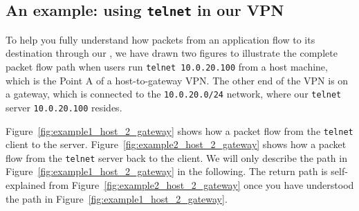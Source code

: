 \subsection{An example: using {\tt telnet} in our VPN} 

To help you fully understand how packets from an application flow to its destination
through our \miniVPN, we have drawn two figures to illustrate the complete 
packet flow path when users run {\tt telnet 10.0.20.100} from a host machine,
which is the Point A of a host-to-gateway VPN. The other end of the VPN is 
on a gateway, which is connected to the {\tt 10.0.20.0/24} network, where 
our {\tt telnet} server {\tt 10.0.20.100} resides. 


Figure~\ref{fig:example1_host_2_gateway} shows how a packet flow 
from the {\tt telnet} client to the server. 
Figure~\ref{fig:example2_host_2_gateway} shows how a packet flow 
from the {\tt telnet} server back to the client. 
We will only describe the path in Figure~\ref{fig:example1_host_2_gateway}
in the following. The return path is self-explained from
Figure~\ref{fig:example2_host_2_gateway} once you have understood 
the path in Figure~\ref{fig:example1_host_2_gateway}. 
